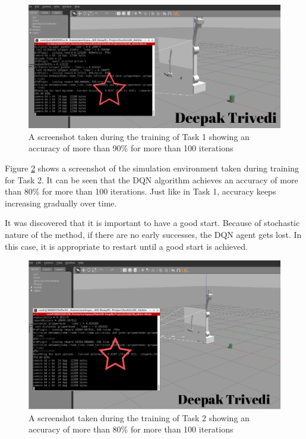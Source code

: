 \documentclass[10pt,journal,compsoc]{IEEEtran}
\begin{document}
\begin{figure}[thpb]
      \centering
      \includegraphics[width=\linewidth]{Task1.png}
      \caption{A screenshot taken during the training of Task 1 showing an accuracy of more than 90\% for more than 100 iterations }
      \label{fig:task1}
\end{figure}

Figure \ref{fig:task2} shows a screenshot of the simulation environment taken during training for Task 2. It can be seen that the DQN algorithm achieves an accuracy of more than 80\% for more than 100 iterations. Just like in Task 1, accuracy keeps increasing gradually over time. 

It was discovered that it is important to have a good start. Because of stochastic nature of the method, if there are no early successes, the DQN agent gets lost. In this case, it is appropriate to restart until a good start is achieved. 

\begin{figure}[thpb]
      \centering
      \includegraphics[width=\linewidth]{Task2.png}
      \caption{A screenshot taken during the training of Task 2 showing an accuracy of more than 80\% for more than 100 iterations }
      \label{fig:task2}
\end{figure}
\end{document}
